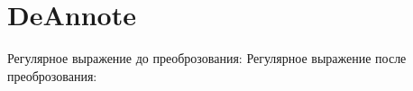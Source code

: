 \section{DeAnnote}
\begin{frame}{}
	Регулярное выражение до преоброзования:
	Регулярное выражение после преоброзования:
\end{frame}
